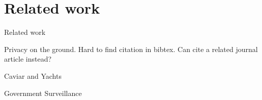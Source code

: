 
\section{Related work}
\label{sec:related}

Related work

Privacy on the ground. Hard to find citation in bibtex. Can cite a related journal article instead?

Caviar and Yachts \cite{johnsoncaviar}

Government Surveillance \cite{laskowskigovernment}
